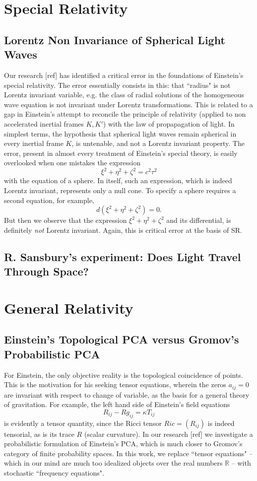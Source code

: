 \documentclass[12pt]{amsart}
\theoremstyle{definition}
\theoremstyle{remark}
\newcommand{\bR}{\mathbb{R}}
\begin{document}
\section{Special Relativity}
\subsection{Lorentz Non Invariance of Spherical Light Waves}
Our research [ref] has identified a critical error in the foundations of Einstein's special relativity. The error essentially consists in this: that ``radius" is not Lorentz invariant variable, e.g. the class of radial solutions of the homogeneous wave equation is not invariant under Lorentz transformations. This is related to a gap in Einstein's attempt to reconcile the principle of relativity (applied to non accelerated inertial frames $K, K'$) with the law of propapagation of light. In simplest terms, the hypothesis that spherical light waves remain spherical in every inertial frame $K$, is untenable, and not a Lorentz invariant property. The error, present in almost every treatment of Einstein's special theory, is easily overlooked when one mistakes the expression $$\xi^2+\eta^2+\zeta^2=c^2 \tau^2$$ with the equation of a sphere. In itself, such an expression, which is indeed Lorentz invariant, represents only a null cone. To specify a sphere requires a second equation, for example, $$d(\xi^2+\eta^2+\zeta^2)=0.$$ But then we observe that the expression $\xi^2+\eta^2+\zeta^2$ and its differential, is definitely \emph{not} Lorentz invariant. Again, this is critical error at the basis of SR.

\subsection{R. Sansbury's experiment: Does Light Travel Through Space?}
 
\section{General Relativity}


\subsection{Einstein's Topological PCA versus Gromov's Probabilistic PCA}
For Einstein, the only objective reality is the topological coincidence of points. This is the motivation for his seeking tensor equations, wherein the zeros $a_{ij}=0$ are invariant with respect to change of variable, as the basis for a general theory of gravitation. For example, the left hand side of Einstein's field equations $$R_{ij}-R g_{ij}=\kappa T_{ij}$$ is evidently a tensor quantity, since the Ricci tensor $Ric=(R_{ij})$ is indeed tensorial, as is its trace $R$ (scalar curvature). In our research [ref] we investigate a probabilistic formulation of Einstein's PCA, which is much closer to Gromov's category of finite probability spaces. In this work, we replace ``tensor equations" -- which in our mind are much too idealized objects over the real numbers $\bR$ --  with stochastic ``frequency equations". 
\end{document}
